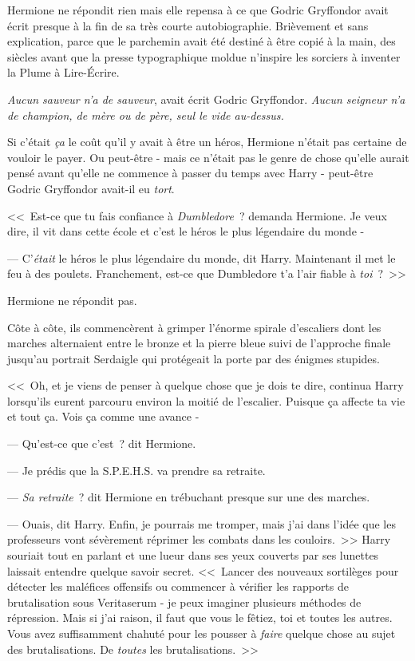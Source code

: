 Hermione ne répondit rien mais elle repensa à ce que Godric Gryffondor avait écrit presque à la fin de sa très courte autobiographie. Brièvement et sans explication, parce que le parchemin avait été destiné à être copié à la main, des siècles avant que la presse typographique moldue n'inspire les sorciers à inventer la Plume à Lire-Écrire.

\emph{Aucun sauveur n'a de sauveur}, avait écrit Godric Gryffondor. \emph{Aucun seigneur n'a de champion, de mère ou de père, seul le vide au-dessus.}

Si c'était \emph{ça} le coût qu'il y avait à être un héros, Hermione n'était pas certaine de vouloir le payer. Ou peut-être - mais ce n'était pas le genre de chose qu'elle aurait pensé avant qu'elle ne commence à passer du temps avec Harry - peut-être Godric Gryffondor avait-il eu \emph{tort}.

<<~Est-ce que tu fais confiance à \emph{Dumbledore}~? demanda Hermione. Je veux dire, il vit dans cette école et c'est le héros le plus légendaire du monde -

--- C'\emph{était} le héros le plus légendaire du monde, dit Harry. Maintenant il met le feu à des poulets. Franchement, est-ce que Dumbledore t'a l'air fiable à \emph{toi}~?~>>

Hermione ne répondit pas.

Côte à côte, ils commencèrent à grimper l'énorme spirale d'escaliers dont les marches alternaient entre le bronze et la pierre bleue suivi de l'approche finale jusqu'au portrait Serdaigle qui protégeait la porte par des énigmes stupides.

<<~Oh, et je viens de penser à quelque chose que je dois te dire, continua Harry lorsqu'ils eurent parcouru environ la moitié de l'escalier. Puisque ça affecte ta vie et tout ça. Vois ça comme une avance -

--- Qu'est-ce que c'est~? dit Hermione.

--- Je prédis que la S.P.E.H.S. va prendre sa retraite.

--- \emph{Sa retraite}~? dit Hermione en trébuchant presque sur une des marches.

--- Ouais, dit Harry. Enfin, je pourrais me tromper, mais j'ai dans l'idée que les professeurs vont sévèrement réprimer les combats dans les couloirs.~>> Harry souriait tout en parlant et une lueur dans ses yeux couverts par ses lunettes laissait entendre quelque savoir secret. <<~Lancer des nouveaux sortilèges pour détecter les maléfices offensifs ou commencer à vérifier les rapports de brutalisation sous Veritaserum - je peux imaginer plusieurs méthodes de répression. Mais si j'ai raison, il faut que vous le fêtiez, toi et toutes les autres. Vous avez suffisamment chahuté pour les pousser à \emph{faire} quelque chose au sujet des brutalisations. De \emph{toutes} les brutalisations.~>>

